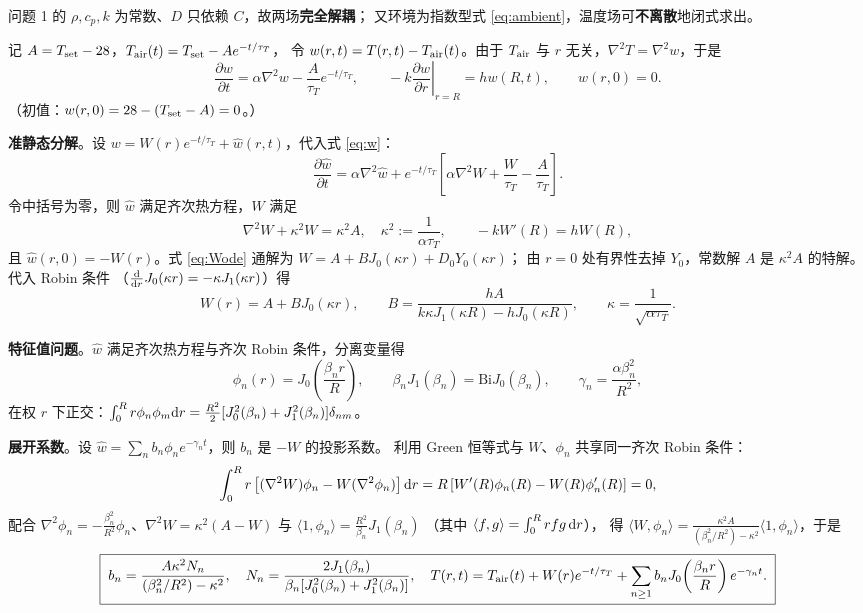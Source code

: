 \documentclass[bwprint]{cumcmthesis}
\begin{document}
问题 1 的 $\rho,c_p,k$ 为常数、$D$ 只依赖 $C$，故两场\textbf{完全解耦}；
又环境为指数型式 \eqref{eq:ambient}，温度场可\textbf{不离散}地闭式求出。

记 $A=T_{\rm set}-28$，$T_{\rm air}(t)=T_{\rm set}-Ae^{-t/\tau_T}$，
令 $w(r,t)=T(r,t)-T_{\rm air}(t)$。由于 $T_{\rm air}$ 与 $r$ 无关，$\nabla^2T=\nabla^2w$，于是
\begin{equation}
\frac{\partial w}{\partial t}=\alpha\nabla^2w-\frac{A}{\tau_T}e^{-t/\tau_T},
\qquad
-k\left.\frac{\partial w}{\partial r}\right|_{r=R}=hw(R,t),
\qquad
w(r,0)=0 .
\label{eq:w}
\end{equation}
（初值：$w(r,0)=28-(T_{\rm set}-A)=0$。）

\textbf{准静态分解}。设 $w=W(r)e^{-t/\tau_T}+\hat w(r,t)$，代入式 \eqref{eq:w}：
\[
\frac{\partial\hat w}{\partial t}=\alpha\nabla^2\hat w
+e^{-t/\tau_T}\left[\alpha\nabla^2W+\frac{W}{\tau_T}-\frac{A}{\tau_T}\right].
\]
令中括号为零，则 $\hat w$ 满足齐次热方程，$W$ 满足
\begin{equation}
\nabla^2W+\kappa^2W=\kappa^2A,\quad \kappa^2:=\frac{1}{\alpha\tau_T},
\qquad
-kW'(R)=hW(R),
\label{eq:Wode}
\end{equation}
且 $\hat w(r,0)=-W(r)$。式 \eqref{eq:Wode} 通解为 $W=A+BJ_0(\kappa r)+D_0Y_0(\kappa r)$；
由 $r=0$ 处有界性去掉 $Y_0$，常数解 $A$ 是 $\kappa^2A$ 的特解。代入 Robin 条件
（$\frac{\rm d}{{\rm d}r}J_0(\kappa r)=-\kappa J_1(\kappa r)$）得
\begin{equation}
\boxed{\;W(r)=A+BJ_0(\kappa r),\qquad
B=\frac{hA}{k\kappa J_1(\kappa R)-hJ_0(\kappa R)},\qquad
\kappa=\frac{1}{\sqrt{\alpha\tau_T}}.\;}
\label{eq:W}
\end{equation}

\textbf{特征值问题}。$\hat w$ 满足齐次热方程与齐次 Robin 条件，分离变量得
\begin{equation}
\phi_n(r)=J_0\!\left(\frac{\beta_nr}{R}\right),
\qquad
\beta_nJ_1(\beta_n)=\mathrm{Bi}J_0(\beta_n),
\qquad
\gamma_n=\frac{\alpha\beta_n^2}{R^2},
\label{eq:eig}
\end{equation}
在权 $r$ 下正交：$\int_0^Rr\phi_n\phi_m{\rm d}r=\frac{R^2}{2}
[J_0^2(\beta_n)+J_1^2(\beta_n)]\delta_{nm}$。

\textbf{展开系数}。设 $\hat w=\sum_nb_n\phi_ne^{-\gamma_nt}$，则 $b_n$ 是 $-W$ 的投影系数。
利用 Green 恒等式与 $W$、$\phi_n$ 共享同一齐次 Robin 条件：
\[
\int_0^Rr\left[(\nabla^2W)\phi_n-W(\nabla^2\phi_n)\right]{\rm d}r
=R\left[W'(R)\phi_n(R)-W(R)\phi_n'(R)\right]=0,
\]
配合 $\nabla^2\phi_n=-\frac{\beta_n^2}{R^2}\phi_n$、$\nabla^2W=\kappa^2(A-W)$
与 $\langle1,\phi_n\rangle=\frac{R^2}{\beta_n}J_1(\beta_n)$
（其中 $\langle f,g\rangle=\int_0^Rrfg\,{\rm d}r$），
得 $\langle W,\phi_n\rangle=\frac{\kappa^2A}{(\beta_n^2/R^2)-\kappa^2}\langle1,\phi_n\rangle$，于是
\begin{equation}
\boxed{\;
b_n=\frac{A\kappa^2N_n}{(\beta_n^2/R^2)-\kappa^2},\quad
N_n=\frac{2J_1(\beta_n)}{\beta_n[J_0^2(\beta_n)+J_1^2(\beta_n)]},\quad
T(r,t)=T_{\rm air}(t)+W(r)e^{-t/\tau_T}+\sum_{n\ge1}b_nJ_0\!\left(\frac{\beta_nr}{R}\right)e^{-\gamma_nt}.
\;}
\label{eq:Tsol}
\end{equation}
\end{document}
